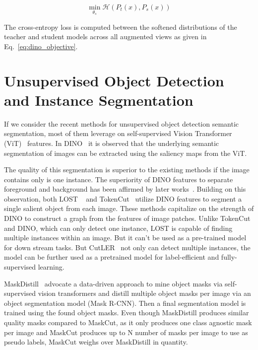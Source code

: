 \begin{equation}
	\label{eq:dino_objective}
	\min_{\theta_s} \mathcal{H}(P_t(x), P_s(x))
\end{equation}

The cross-entropy loss is computed between the softened distributions of the teacher and student models across all augmented views as given in Eq.~\ref{eq:dino_objective}.


\section{Unsupervised Object Detection and Instance Segmentation}
If we consider the recent methods for unsupervised object detection semantic segmentation, most of them leverage on self-supervised Vision Transformer (ViT)~\cite{dosovitskiy2020image} features. In DINO~\cite{caron2021emerging} it is observed that the underlying semantic segmentation of images can be extracted using the saliency maps from the ViT. 

The quality of this segmentation is superior to the existing methods if the image contains only is one instance. The superiority of DINO features to separate foreground and background has been affirmed by later works~\cite{engstler2023understanding}. Building on this observation, both LOST ~\cite{simeoni2021localizing} and TokenCut~\cite{wang2022tokencut} utilize DINO features to segment a single salient object from each image. These methods capitalize on the strength of DINO to construct a graph from the features of image patches. Unlike TokenCut and DINO, which can only detect one instance, LOST is capable of finding multiple instances within an image. But it can't be used as a pre-trained model for down stream tasks. But CutLER~\cite{wang2023cut} not only can detect multiple instances, the model can be further used as a pretrained model for label-efficient and fully-supervised learning.

MaskDistill~\cite{vangansbeke2022discovering} advocate a data-driven approach to mine object masks via self-supervised vision transformers and distill multiple object masks per image via an object segmentation model (Mask R-CNN). Then a final segmentation model is trained using the found object masks. Even though MaskDistill produces similar quality masks compared to MaskCut, as it only produces one class agnostic mask per image and MaskCut produces up to N number of masks per image to use as pseudo labels, MaskCut weighs over MaskDistill in quantity.

